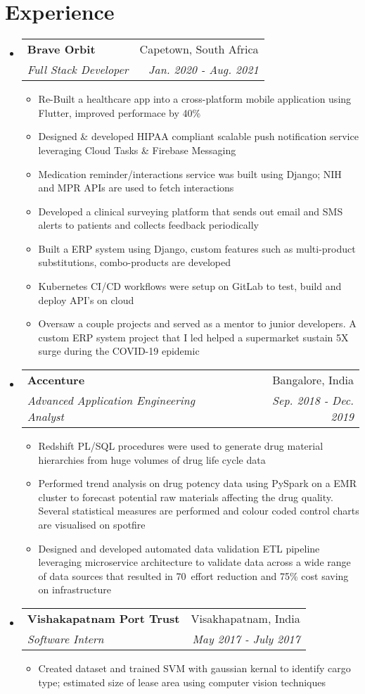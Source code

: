 \documentclass[letterpaper,10pt]{article}
\makeatletter
\newcommand{\resumeItemClean}[1]{
    \item\small{
        {#1 \vspace{-2pt}}
    }
}
\newcommand{\resumeSubheading}[4]{
  \vspace{-1pt}\item
    \begin{tabular*}{0.97\textwidth}[t]{l@{\extracolsep{\fill}}r}
      \textbf{#1} & #2 \\
      \textit{\small#3} & \textit{\small #4} \\
    \end{tabular*}\vspace{-5pt}
}
\newcommand{\resumeSubHeadingListStart}{\begin{itemize}[leftmargin=*]}
\newcommand{\resumeSubHeadingListEnd}{\end{itemize}}
\newcommand{\resumeItemListStart}{\begin{itemize}}
\newcommand{\resumeItemListEnd}{\end{itemize}\vspace{-5pt}}
\makeatother
\begin{document}
\section{Experience}
    \resumeSubHeadingListStart
    \resumeSubheading{Brave Orbit}{Capetown, South Africa}
        {Full Stack Developer}{Jan. 2020 - Aug. 2021}
            \resumeItemListStart
                \resumeItemClean
                    {Re-Built a healthcare app into a cross-platform mobile application using Flutter, improved performace by 40\%}
                  \resumeItemClean
                    {Designed \& developed HIPAA compliant scalable push notification service leveraging Cloud Tasks \& Firebase Messaging}
                  \resumeItemClean
                    {Medication reminder/interactions service was built using Django; NIH and MPR APIs are used to fetch interactions}
                  \resumeItemClean
                    {Developed a clinical surveying platform that sends out email and SMS alerts to patients and collects feedback periodically}
                  \resumeItemClean
                    {Built a ERP system using Django, custom features such as multi-product substitutions, combo-products are developed}
                  \resumeItemClean
                    {Kubernetes CI/CD workflows were setup on GitLab to test, build and deploy API's on cloud}
                  \resumeItemClean
                    {Oversaw a couple projects and served as a mentor to junior developers. A custom ERP system project that I led helped a supermarket sustain 5X surge during the COVID-19 epidemic}
                  
              \resumeItemListEnd
    \resumeSubheading
    	{Accenture}{Bangalore, India}
    	{Advanced Application Engineering Analyst}{Sep. 2018 -  Dec. 2019}
    	    \resumeItemListStart
                \resumeItemClean
                  {Redshift PL/SQL procedures were used to generate drug material hierarchies from huge volumes of drug life cycle data}
                \resumeItemClean
                  {Performed trend analysis on drug potency data using PySpark on a EMR cluster to forecast potential raw materials affecting the drug quality. Several statistical measures are performed and colour coded control charts are visualised on spotfire}
                \resumeItemClean
                  {Designed and developed automated data validation ETL pipeline leveraging microservice architecture to validate data across a wide range of data sources that resulted in 70\
                  effort reduction and 75\% cost saving on infrastructure}
    	    \resumeItemListEnd
    \resumeSubheading
    	{Vishakapatnam Port Trust}{Visakhapatnam, India}
    	{Software Intern}{May 2017 -  July 2017}
    	    \resumeItemListStart
                \resumeItemClean
                  {Created dataset and trained SVM with gaussian kernal to identify cargo type; estimated size of lease area using computer vision techniques}
    	    \resumeItemListEnd
    \resumeSubHeadingListEnd
\end{document}
